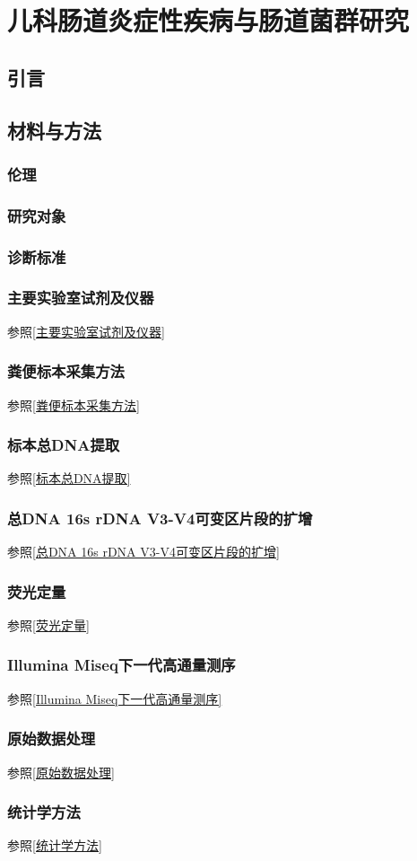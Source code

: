 
\chapter{儿科肠道炎症性疾病与肠道菌群研究}
\label{chap:compare}

\section{引言}
\section{材料与方法}
  \subsection{伦理}

  \subsection{研究对象}

  \subsection{诊断标准}



  \subsection{主要实验室试剂及仪器}
  参照\ref{主要实验室试剂及仪器}
  \subsection{粪便标本采集方法}
  参照\ref{粪便标本采集方法}
  \subsection{标本总DNA提取}
  参照\ref{标本总DNA提取}
  \subsection{总DNA 16s rDNA V3-V4可变区片段的扩增}
  参照\ref{总DNA 16s rDNA V3-V4可变区片段的扩增}
  \subsection{荧光定量}
  参照\ref{荧光定量}
  \subsection{Illumina Miseq下一代高通量测序}
  参照\ref{Illumina Miseq下一代高通量测序}
  \subsection{原始数据处理}
  参照\ref{原始数据处理}
  \subsection{统计学方法}
  参照\ref{统计学方法}
